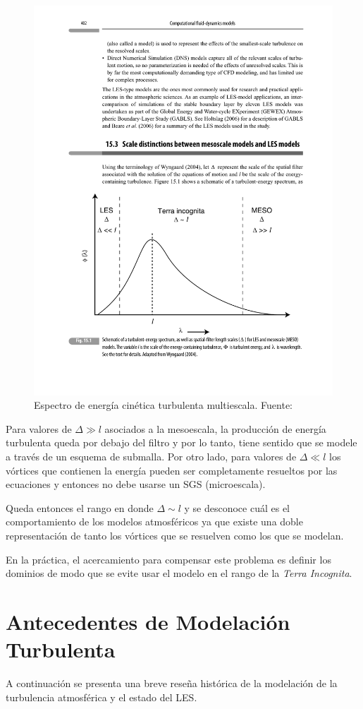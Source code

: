 \begin{figure}[H]
	\centering
	\includegraphics[width=0.69\linewidth,trim={2cm 3.0cm 1.5cm 11.5cm},clip]{Imagenes/02/terra_inc}
	\caption{Espectro de energía cinética turbulenta multiescala. Fuente: \cite{warner2010numerical}}
	\label{fig:02_terra_inc}
\end{figure}

Para valores de $\Delta\gg l$ asociados a la mesoescala, la producción de energía turbulenta queda por debajo del filtro y por lo tanto, tiene sentido que se modele a través de un esquema de submalla. Por otro lado, para valores de $\Delta\ll l$ los vórtices que contienen la energía pueden ser completamente resueltos por las ecuaciones y entonces no debe usarse un SGS (microescala).

Queda entonces el rango en donde $\Delta\sim l$ y se desconoce cuál es el comportamiento de los modelos atmosféricos ya que existe una doble representación de tanto los vórtices que se resuelven como los que se modelan.

En la práctica, el acercamiento para compensar este problema es definir los dominios de modo que se evite usar el modelo en el rango de la \emph{Terra Incognita}.

\newpage
\section{Antecedentes de Modelación Turbulenta}
A continuación se presenta una breve reseña histórica de la modelación de la turbulencia atmosférica y el estado del LES.

